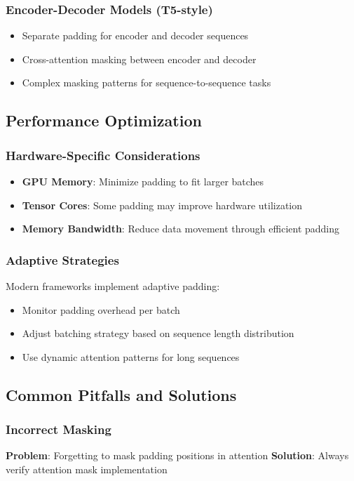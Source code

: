 \subsubsection{Encoder-Decoder Models (T5-style)}
\begin{itemize}
\item Separate padding for encoder and decoder sequences
\item Cross-attention masking between encoder and decoder
\item Complex masking patterns for sequence-to-sequence tasks
\end{itemize}

\subsection{Performance Optimization}

\subsubsection{Hardware-Specific Considerations}
\begin{itemize}
\item \textbf{GPU Memory}: Minimize padding to fit larger batches
\item \textbf{Tensor Cores}: Some padding may improve hardware utilization
\item \textbf{Memory Bandwidth}: Reduce data movement through efficient padding
\end{itemize}

\subsubsection{Adaptive Strategies}
Modern frameworks implement adaptive padding:
\begin{itemize}
\item Monitor padding overhead per batch
\item Adjust batching strategy based on sequence length distribution
\item Use dynamic attention patterns for long sequences
\end{itemize}

\subsection{Common Pitfalls and Solutions}

\subsubsection{Incorrect Masking}
\textbf{Problem}: Forgetting to mask padding positions in attention
\textbf{Solution}: Always verify attention mask implementation


